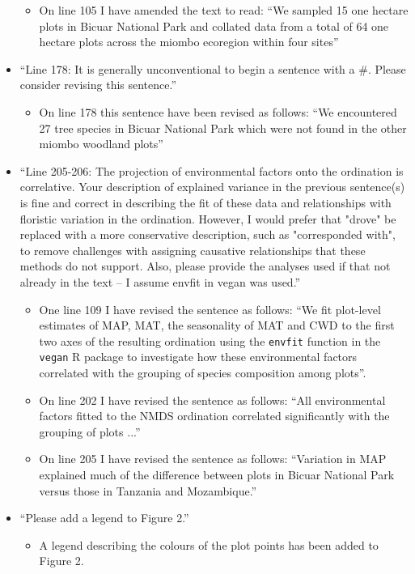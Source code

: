 \documentclass[a4paper]{letter}
\begin{document}
\begin{letter}{}
\begin{itemize}
\begin{itemize}
			\item{On line 105 I have amended the text to read: ``We sampled 15 one hectare plots in Bicuar National Park and collated data from a total of 64 one hectare plots across the miombo ecoregion within four sites''}
		\end{itemize}
	\item{``Line 178: It is generally unconventional to begin a sentence with a \#. Please consider revising this sentence.''}
		\begin{itemize}
			\item{On line 178 this sentence have been revised as follows: ``We encountered 27 tree species in Bicuar National Park which were not found in the other miombo woodland plots''}
		\end{itemize}
	\item{``Line 205-206: The projection of environmental factors onto the ordination is correlative. Your description of explained variance in the previous sentence(s) is fine and correct in describing the fit of these data and relationships with floristic variation in the ordination. However, I would prefer that "drove" be replaced with a more conservative description, such as "corresponded with", to remove challenges with assigning causative relationships that these methods do not support. Also, please provide the analyses used if that not already in the text – I assume envfit in vegan was used.''}
		\begin{itemize}
			\item{One line 109 I have revised the sentence as follows: ``We fit plot-level estimates of MAP, MAT, the seasonality of MAT and CWD to the first two axes of the resulting ordination using the \texttt{envfit} function in the \texttt{vegan} R package to investigate how these environmental factors correlated with the grouping of species composition among plots''.}
			\item{On line 202 I have revised the sentence as follows: ``All environmental factors fitted to the NMDS ordination correlated significantly with the grouping of plots ...''}
			\item{On line 205 I have revised the sentence as follows: ``Variation in MAP explained much of the difference between plots in Bicuar National Park versus those in Tanzania and Mozambique.''}
		\end{itemize}
	\item{``Please add a legend to Figure 2.''}
		\begin{itemize}
			\item{A legend describing the colours of the plot points has been added to Figure 2.}

\end{itemize}
\end{itemize}
\end{letter}
\end{document}
